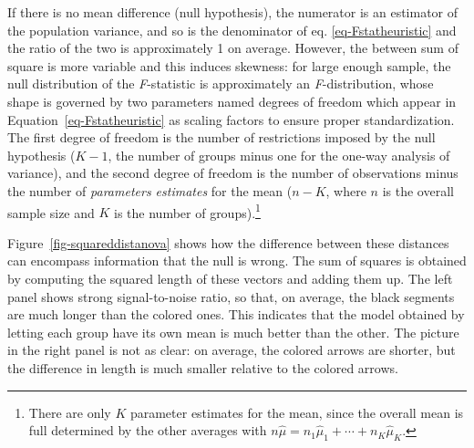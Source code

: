\documentclass[
  11pt,
  letterpaper,
]{scrbook}
\theoremstyle{definition}
\theoremstyle{remark}
\begin{document}
If there is no mean difference (null hypothesis), the numerator is an
estimator of the population variance, and so is the denominator of eq.
\ref{eq-Fstatheuristic} and the ratio of the two is approximately 1 on
average. However, the between sum of square is more variable and this
induces skewness: for large enough sample, the null distribution of the
\emph{F}-statistic is approximately an \emph{F}-distribution, whose
shape is governed by two parameters named degrees of freedom which
appear in Equation~\ref{eq-Fstatheuristic} as scaling factors to ensure
proper standardization. The first degree of freedom is the number of
restrictions imposed by the null hypothesis (\(K-1\), the number of
groups minus one for the one-way analysis of variance), and the second
degree of freedom is the number of observations minus the number of
\emph{parameters estimates} for the mean (\(n-K\), where \(n\) is the
overall sample size and \(K\) is the number of groups).\footnote{There
  are only \(K\) parameter estimates for the mean, since the overall
  mean is full determined by the other averages with
  \(n\widehat{\mu} =n_1\widehat{\mu}_1 + \cdots + n_K \widehat{\mu}_K\).}

Figure~\ref{fig-squareddistanova} shows how the difference between these
distances can encompass information that the null is wrong. The sum of
squares is obtained by computing the squared length of these vectors and
adding them up. The left panel shows strong signal-to-noise ratio, so
that, on average, the black segments are much longer than the colored
ones. This indicates that the model obtained by letting each group have
its own mean is much better than the other. The picture in the right
panel is not as clear: on average, the colored arrows are shorter, but
the difference in length is much smaller relative to the colored arrows.
\end{document}
